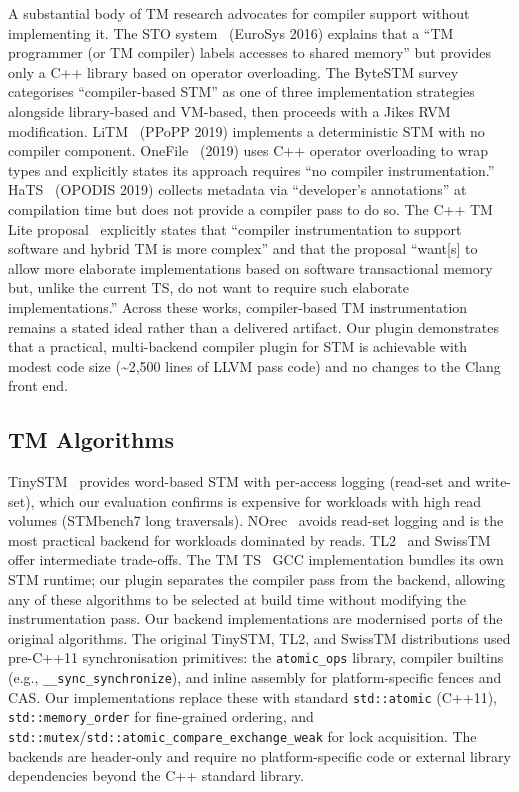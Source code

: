 \documentclass[article,12pt]{article}
\begin{document}
A substantial body of TM research advocates for compiler support without
implementing it.  The STO system~\cite{STO} (EuroSys 2016) explains that a
``TM programmer (or TM compiler) labels accesses to shared memory'' but
provides only a C++ library based on operator overloading.  The ByteSTM
survey~\cite{ByteSTM} categorises ``compiler-based STM'' as one of three
implementation strategies alongside library-based and VM-based, then proceeds
with a Jikes RVM modification.  LiTM~\cite{LiTM} (PPoPP 2019) implements a
deterministic STM with no compiler component.  OneFile~\cite{OneFile} (2019)
uses C++ operator overloading to wrap types and explicitly states its approach
requires ``no compiler instrumentation.''  HaTS~\cite{HaTS} (OPODIS 2019)
collects metadata via ``developer's annotations'' at compilation time but
does not provide a compiler pass to do so.  The C++ TM Lite
proposal~\cite{P1875,P2066} explicitly states that ``compiler instrumentation
to support software and hybrid TM is more complex'' and that the proposal
``want[s] to allow more elaborate implementations based on software
transactional memory but, unlike the current TS, do not want to require such
elaborate implementations.''  Across these works, compiler-based TM
instrumentation remains a stated ideal rather than a delivered artifact.
Our plugin demonstrates that a practical, multi-backend compiler plugin for
STM is achievable with modest code size (\textasciitilde 2,500 lines of LLVM
pass code) and no changes to the Clang front end.

\subsection{TM Algorithms}

TinySTM~\cite{TinySTM} provides word-based STM with per-access logging (read-set
and write-set), which our evaluation confirms is expensive for workloads with
high read volumes (STMbench7 long traversals).  NOrec~\cite{NOrec} avoids
read-set logging and is the most practical backend for workloads dominated by
reads.  TL2~\cite{TL2} and SwissTM~\cite{SwissTM} offer intermediate trade-offs.
The TM TS~\cite{TMTS} GCC implementation bundles its own STM runtime; our plugin
separates the compiler pass from the backend, allowing any of these algorithms
to be selected at build time without modifying the instrumentation pass.
Our backend implementations are modernised ports of the original algorithms.
The original TinySTM, TL2, and SwissTM distributions used pre-C++11
synchronisation primitives: the \texttt{atomic\_ops} library, compiler builtins
(e.g., \texttt{\_\_sync\_synchronize}), and inline assembly for platform-specific
fences and CAS.  Our implementations replace these with standard
\texttt{std::atomic} (C++11), \texttt{std::memory\_order} for fine-grained
ordering, and \texttt{std::mutex}/\texttt{std::atomic\_compare\_exchange\_weak}
for lock acquisition.  The backends are header-only and require no platform-specific
code or external library dependencies beyond the C++ standard library.
\end{document}
